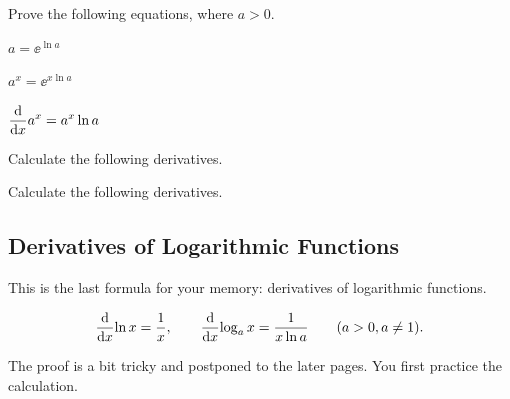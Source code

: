 \documentclass[11pt,pdfa,lastpage]{MishoNote}
\newcommand\starskip{\bigskip\begin{center}\pgfornament[width=7cm]{88}\end{center}\medskip}
\begin{document}
\starskip

\begin{enumerate}[resume]
  \itemB Prove the following equations, where $a>0$.
  \begin{menumerate}{3}
    \item $a=\ee^{\ln a}$
    \item $a^x=\ee^{x\ln a}$
    \item $\displaystyle\diff{}{x}a^x=a^x\ln a$
  \end{menumerate}
  \itemS Calculate the following derivatives.
    \begin{menumerate}{4}
    \end{menumerate}
  \itemB Calculate the following derivatives.
    \begin{menumerate}{3}
    \end{menumerate}
\end{enumerate}

\newpage
\subsection{Derivatives of Logarithmic Functions}
This is the last formula for your memory: derivatives of logarithmic functions.
\begin{theorem}{}{}
  \begin{equation}
      \diff{}x{\ln x}=\frac{1}{x},\qquad
      \diff{}x{\log_a x}=\frac{1}{x\ln a}\qquad(a>0,a\neq 1).\label{eq:log-deriv}
  \end{equation}
\end{theorem}
The proof is a bit tricky and postponed to the later pages. You first practice the calculation.

\starskip
\end{document}
